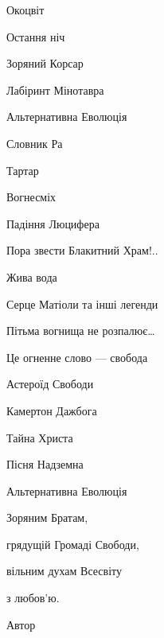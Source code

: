 Окоцвіт

Остання ніч

Зоряний Корсар

Лабіринт Мінотавра

Альтернативна Еволюція

Словник Ра

Тартар

Вогнесміх

Падіння Люцифера

Пора звести Блакитний Храм!..

Жива вода

Серце Матіоли та інші легенди

Пітьма вогнища не розпалює…

Це огненне слово — свобода

Астероїд Свободи

Камертон Дажбога

Тайна Христа

Пісня Надземна

Альтернативна Еволюція

Зоряним Братам,

грядущій Громаді Свободи,

вільним духам Всесвіту

з любов’ю.

Автор


